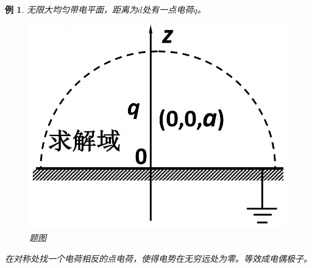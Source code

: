 \documentclass[12pt,onecolumn,a4paper]{book}
\newtheorem*{example}{例}
\numberwithin{table}{subsection}
\numberwithin{equation}{subsection}
\begin{document}
\begin{example}
    无限大均匀带电平面，距离为$d$处有一点电荷$q$。

    \begin{figure}[ht]
        \centering
        \includegraphics[scale=0.2]{pic/2.2.4.1.png}
        \caption{题图}
    \end{figure}

    在对称处找一个电荷相反的点电荷，使得电势在无穷远处为零。等效成电偶极子。
\end{example}
\end{document}
